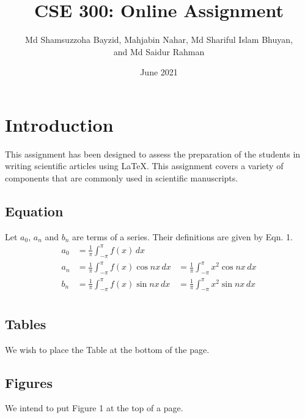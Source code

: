 \documentclass[12pt, a4paper]{article} %
\title{CSE 300: Online Assignment}
\author{Md Shamsuzzoha Bayzid, Mahjabin Nahar, Md Shariful Islam Bhuyan,\\
	and Md Saidur Rahman
}
\date{June 2021}
\begin{document}
	\maketitle
	
	\section{Introduction}
	This assignment has been designed to assess the preparation of the students
	in writing scientific articles using \LaTeX. This assignment covers a variety of
	components that are commonly used in scientific manuscripts.
	

	
	\subsection{Equation}
	Let $a_0$, $a_n$ and $b_n$ are terms of a series. Their definitions are given by Eqn. 1.\\
	

\begin{equation}
	\begin{split}
		a_0 & = \frac{1}{\pi} \int_{-\pi}^{\pi}f(x)\,dx\\
		a_n & = \frac{1}{\pi} \int_{-\pi}^{\pi}f(x)\cos nx\,dx & = \frac{1}{\pi} \int_{-\pi}^{\pi}x^2\cos nx\,dx \nonumber \\
		b_n & = \frac{1}{\pi} \int_{-\pi}^{\pi}f(x)\sin nx\,dx & = \frac{1}{\pi} \int_{-\pi}^{\pi}x^2\sin nx\,dx\\
	\end{split}
\end{equation}

	\subsection{Tables}
	We wish to place the Table at the bottom of the page.
	
	\subsection{Figures}
	We intend to put Figure 1 at the top of a page.
	
	\pagebreak
%	
		
\end{document}
